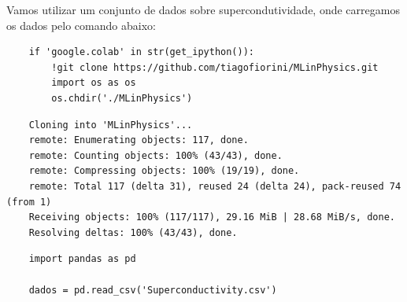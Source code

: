 Vamos utilizar um conjunto de dados sobre supercondutividade, onde carregamos os dados pelo comando abaixo:
\begin{longlisting}
    \begin{verbatim}
    if 'google.colab' in str(get_ipython()):
        !git clone https://github.com/tiagofiorini/MLinPhysics.git
        import os as os
        os.chdir('./MLinPhysics')
    \end{verbatim}
\end{longlisting}
\begin{verbatim}
    Cloning into 'MLinPhysics'...
    remote: Enumerating objects: 117, done.
    remote: Counting objects: 100% (43/43), done.
    remote: Compressing objects: 100% (19/19), done.
    remote: Total 117 (delta 31), reused 24 (delta 24), pack-reused 74 (from 1)
    Receiving objects: 100% (117/117), 29.16 MiB | 28.68 MiB/s, done.
    Resolving deltas: 100% (43/43), done.
\end{verbatim}

\begin{longlisting}
    \begin{verbatim}
    import pandas as pd

    dados = pd.read_csv('Superconductivity.csv')
    \end{verbatim}
\end{longlisting}

